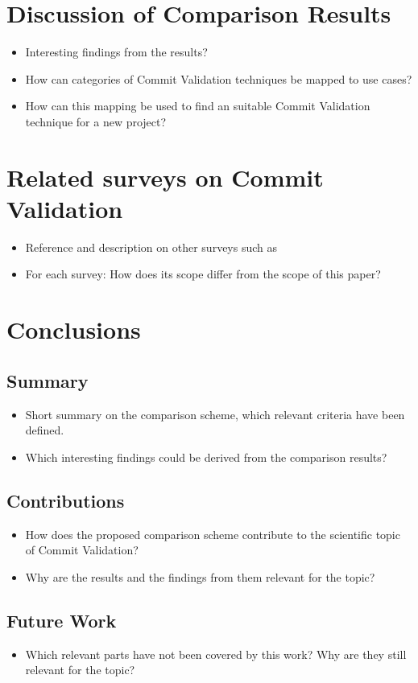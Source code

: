 \section{Discussion of Comparison Results}
\begin{itemize}
	\item Interesting findings from the results?
	\item How can categories of Commit Validation techniques be mapped to use cases?
	\item How can this mapping be used to find an suitable Commit Validation technique for a new project?
\end{itemize}


\section{Related surveys on Commit Validation}
\begin{itemize}
	\item Reference and description on other surveys such as \cite{Kim2008,Catolino2019,Syed2019,Yang2016}
	\item For each survey: How does its scope differ from the scope of this paper?
\end{itemize}


\section{Conclusions}

\subsection{Summary}
\begin{itemize}
	\item Short summary on the comparison scheme, which relevant criteria have been defined.
	\item Which interesting findings could be derived from the comparison results?
\end{itemize}

\subsection{Contributions}
\begin{itemize}
	\item How does the proposed comparison scheme contribute to the scientific topic of Commit Validation?
	\item Why are the results and the findings from them relevant for the topic?
\end{itemize}

\subsection{Future Work}
\begin{itemize}
	\item Which relevant parts have not been covered by this work? Why are they still relevant for the topic?
\end{itemize}
